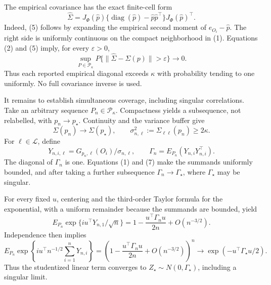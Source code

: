 The empirical covariance has the exact finite-cell form
\[
 \widehat\Sigma
 =J_{\Phi}(\widehat p)
   \{\operatorname{diag}(\widehat p)-\widehat p\widehat p^\top\}
   J_{\Phi}(\widehat p)^\top.                              \tag{5}
\]
Indeed, (5) follows by expanding the empirical second moment of \(e_{O_i}-\widehat p\).  The right side is uniformly continuous on the compact neighborhood in (1).  Equations (2) and (5) imply, for every \(\varepsilon>0\),
\[
 \sup_{P\in\mathcal P_\kappa}
 P\{\|\widehat\Sigma-\Sigma(p)\|>\varepsilon\}\longrightarrow0.                            \tag{6}
\]
Thus each reported empirical diagonal exceeds \(\kappa\) with probability tending to one uniformly.  No full covariance inverse is used.

It remains to establish simultaneous coverage, including singular correlations.  Take an arbitrary sequence \(P_n\in\mathcal P_\kappa\).  Compactness yields a subsequence, not relabelled, with \(p_n\to p_\star\).  Continuity and the variance buffer give
\[
 \Sigma(p_n)\to\Sigma(p_\star),
 \qquad \sigma_{n,\ell}^2:=\Sigma_{\ell\ell}(p_n)\geq2\kappa.                               \tag{7}
\]
For \(\ell\in\mathcal L\), define
\[
 Y_{n,i,\ell}=G_{p_n,\ell}(O_i)/\sigma_{n,\ell},
 \qquad \Gamma_n=E_{P_n}(Y_{n,i}Y_{n,i}^\top).
\]
The diagonal of \(\Gamma_n\) is one.  Equations (1) and (7) make the summands uniformly bounded, and after taking a further subsequence \(\Gamma_n\to\Gamma_\star\), where \(\Gamma_\star\) may be singular.

For every fixed \(u\), centering and the third-order Taylor formula for the exponential, with a uniform remainder because the summands are bounded, yield
\[
 E_{P_n}\exp\{iu^\top Y_{n,1}/\sqrt n\}
 =1-\frac{u^\top\Gamma_nu}{2n}+O(n^{-3/2}).                \tag{8}
\]
Independence then implies
\[
 E_{P_n}\exp\!\left\{iu^\top n^{-1/2}\sum_{i=1}^nY_{n,i}\right\}
 =\left(1-\frac{u^\top\Gamma_nu}{2n}+O(n^{-3/2})\right)^n
 \longrightarrow\exp(-u^\top\Gamma_\star u/2).           \tag{9}
\]
Thus the studentized linear term converges to \(Z_\star\sim N(0,\Gamma_\star)\), including a singular limit.

